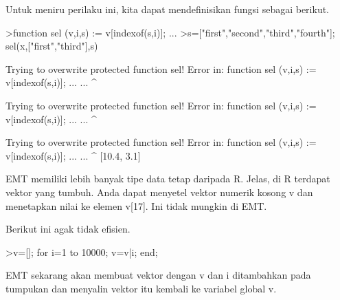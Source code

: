 \documentclass[a4paper,10pt]{article}
\begin{document}
\begin{eulernotebook}
\begin{eulercomment}
\begin{eulercomment}
\begin{eulercomment}
\begin{eulercomment}
\begin{eulercomment}
\begin{eulercomment}
\begin{eulercomment}
\begin{eulercomment}
\begin{eulercomment}
\begin{eulercomment}
\begin{eulercomment}
\begin{eulercomment}
\begin{eulercomment}
\begin{eulercomment}
\begin{eulercomment}
\begin{eulercomment}
\begin{eulercomment}
\begin{eulercomment}
\begin{eulercomment}
Untuk meniru perilaku ini, kita dapat mendefinisikan fungsi sebagai
berikut.
\end{eulercomment}
\begin{eulerprompt}
>function sel (v,i,s) := v[indexof(s,i)]; ...
>s=["first","second","third","fourth"]; sel(x,["first","third"],s)
\end{eulerprompt}
\begin{euleroutput}
  
  Trying to overwrite protected function sel!
  Error in:
  function sel (v,i,s) := v[indexof(s,i)]; ... ...
               ^
  
  Trying to overwrite protected function sel!
  Error in:
  function sel (v,i,s) := v[indexof(s,i)]; ... ...
               ^
  
  Trying to overwrite protected function sel!
  Error in:
  function sel (v,i,s) := v[indexof(s,i)]; ... ...
               ^
  [10.4,  3.1]
\end{euleroutput}
\begin{eulercomment}
EMT memiliki lebih banyak tipe data tetap daripada R. Jelas, di R
terdapat vektor yang tumbuh. Anda dapat menyetel vektor numerik kosong
v dan menetapkan nilai ke elemen v[17]. Ini tidak mungkin di EMT.

Berikut ini agak tidak efisien.
\end{eulercomment}
\begin{eulerprompt}
>v=[]; for i=1 to 10000; v=v|i; end;
\end{eulerprompt}
\begin{eulercomment}
EMT sekarang akan membuat vektor dengan v dan i ditambahkan pada
tumpukan dan menyalin vektor itu kembali ke variabel global v.


\end{eulercomment}
\end{eulercomment}
\end{eulercomment}
\end{eulercomment}
\end{eulercomment}
\end{eulercomment}
\end{eulercomment}
\end{eulercomment}
\end{eulercomment}
\end{eulercomment}
\end{eulercomment}
\end{eulercomment}
\end{eulercomment}
\end{eulercomment}
\end{eulercomment}
\end{eulercomment}
\end{eulercomment}
\end{eulercomment}
\end{eulercomment}
\end{eulernotebook}
\end{document}
